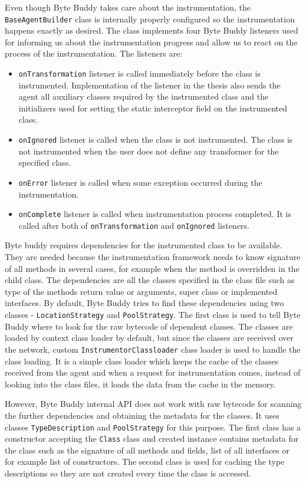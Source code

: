 Even though Byte Buddy takes care about the instrumentation, the \texttt{BaseAgentBuilder} class is internally properly configured so the instrumentation happens exactly as desired. The class implements four Byte Buddy listeners used for informing us about the instrumentation progress and allow us to react on the process of the instrumentation. The listeners are:
\begin{itemize}
	\item \texttt{onTransformation} listener is called immediately before the class is instrumented.  Implementation of the listener in the thesis also sends the agent all auxiliary classes required by the instrumented class and the initializers used for setting the static interceptor field on the instrumented class.
	\item \texttt{onIgnored} listener is called when the class is not instrumented. The class is not instrumented when the user does not define any transformer for the specified class.
	\item \texttt{onError} listener is called when some exception occurred during the instrumentation.
	\item \texttt{onComplete} listener is called when instrumentation process completed. It is called after both of \texttt{onTransformation} and \texttt{onIgnored} listeners.
\end{itemize}

Byte buddy requires dependencies for the instrumented class to be available. They are needed because the instrumentation framework needs to know signature of all methods in several cases, for example when the method is overridden in the child class. The dependencies are all the classes specified in the class file such as type of the methods return value or arguments, super class or implemented interfaces. 
By default, Byte Buddy tries to find these dependencies using two classes - \texttt{LocationStrategy} and \texttt{PoolStrategy}. The first class is used to tell Byte Buddy where to look for the raw bytecode of dependent classes. The classes are loaded by context class loader by default, but since the classes are received over the network, custom \texttt{InstrumentorClassloader} class loader is used to handle the class loading. It is a simple class loader which keeps the cache of the classes received from the agent and when a request for instrumentation comes, instead of looking into the class files, it loads the data from the cache in the memory.

However, Byte Buddy internal API does not work with raw bytecode for scanning the further dependencies and obtaining the metadata for the classes. It uses classes \texttt{TypeDescription} and \texttt{PoolStrategy} for this purpose. The first class has a constructor accepting the \texttt{Class} class and created instance contains metadata for the class such as the signature of all methods and fields, list of all interfaces or for example list of constructors. The second class is used for caching the type descriptions so they are not created every time the class is accessed. 

